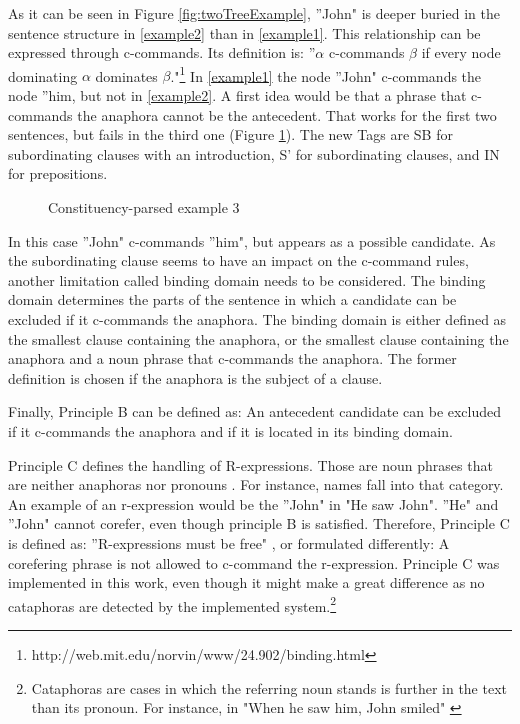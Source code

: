 As it can be seen in Figure \ref{fig:twoTreeExample}, ''John" is deeper buried in the sentence structure in \ref{example2} than in \ref{example1}. This relationship can be expressed through c-commands. Its definition is: ''$\alpha$ c-commands $\beta$ if every node dominating $\alpha$ dominates $\beta$."\footnote{http://web.mit.edu/norvin/www/24.902/binding.html} In \ref{example1} the node ''John" c-commands the node ''him, but not in \ref{example2}. A first idea would be that a phrase that c-commands the anaphora cannot be the antecedent. That works for the first two sentences, but fails in the third one (Figure \ref{fig:ExampleTreeThree}). The new Tags are SB for subordinating clauses with an introduction, S' for subordinating clauses, and IN for prepositions.

\begin{figure}[h]
    \centering\sffamily
{}
    \caption{Constituency-parsed example 3}%
    \label{fig:ExampleTreeThree}%
\end{figure}

In this case ''John" c-commands ''him", but appears as a possible candidate. As the subordinating clause seems to have an impact on the c-command rules, another limitation called binding domain needs to be considered. The binding domain determines the parts of the sentence in which a candidate can be excluded if it c-commands the anaphora. The binding domain is either defined as the smallest clause containing the anaphora, or the smallest clause containing the anaphora and a noun phrase that c-commands the anaphora. The former definition is chosen if the anaphora is the subject of a clause. 

Finally, Principle B can be defined as: An antecedent candidate can be excluded if it c-commands the anaphora and if it is located in its binding domain.

Principle C defines the handling of R-expressions. Those are noun phrases that are neither anaphoras nor pronouns \citep{crystal2011dictionary}. For instance, names fall into that category. An example of an r-expression would be the ''John" in "He saw John". ''He" and ''John" cannot corefer, even though principle B is satisfied. Therefore, Principle C is defined as: ''R-expressions must be free" \citep{chomsky1993lectures}, or formulated differently: A corefering phrase is not allowed to c-command the r-expression. Principle C was implemented in this work, even though it might make a great difference as no cataphoras are detected by the implemented system.\footnote{Cataphoras are cases in which the referring noun stands is further in the text than its pronoun. For instance, in "When he saw him, John smiled" \citep[p. 10]{cutting2005pragmatics}}

